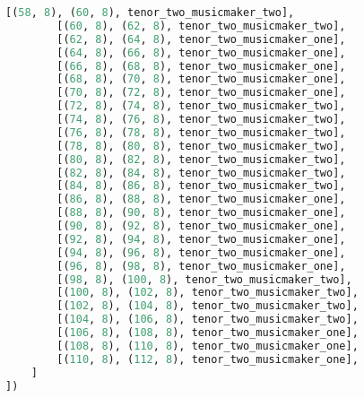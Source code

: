 \begin{lstlisting}[language=Python, caption=Invocation Source Code]
        [(58, 8), (60, 8), tenor_two_musicmaker_two],
        [(60, 8), (62, 8), tenor_two_musicmaker_two],
        [(62, 8), (64, 8), tenor_two_musicmaker_one],
        [(64, 8), (66, 8), tenor_two_musicmaker_one],
        [(66, 8), (68, 8), tenor_two_musicmaker_one],
        [(68, 8), (70, 8), tenor_two_musicmaker_one],
        [(70, 8), (72, 8), tenor_two_musicmaker_one],
        [(72, 8), (74, 8), tenor_two_musicmaker_two],
        [(74, 8), (76, 8), tenor_two_musicmaker_two],
        [(76, 8), (78, 8), tenor_two_musicmaker_two],
        [(78, 8), (80, 8), tenor_two_musicmaker_two],
        [(80, 8), (82, 8), tenor_two_musicmaker_two],
        [(82, 8), (84, 8), tenor_two_musicmaker_two],
        [(84, 8), (86, 8), tenor_two_musicmaker_two],
        [(86, 8), (88, 8), tenor_two_musicmaker_one],
        [(88, 8), (90, 8), tenor_two_musicmaker_one],
        [(90, 8), (92, 8), tenor_two_musicmaker_one],
        [(92, 8), (94, 8), tenor_two_musicmaker_one],
        [(94, 8), (96, 8), tenor_two_musicmaker_one],
        [(96, 8), (98, 8), tenor_two_musicmaker_one],
        [(98, 8), (100, 8), tenor_two_musicmaker_two],
        [(100, 8), (102, 8), tenor_two_musicmaker_two],
        [(102, 8), (104, 8), tenor_two_musicmaker_two],
        [(104, 8), (106, 8), tenor_two_musicmaker_two],
        [(106, 8), (108, 8), tenor_two_musicmaker_one],
        [(108, 8), (110, 8), tenor_two_musicmaker_one],
        [(110, 8), (112, 8), tenor_two_musicmaker_one],
    ]
])


\end{lstlisting}
